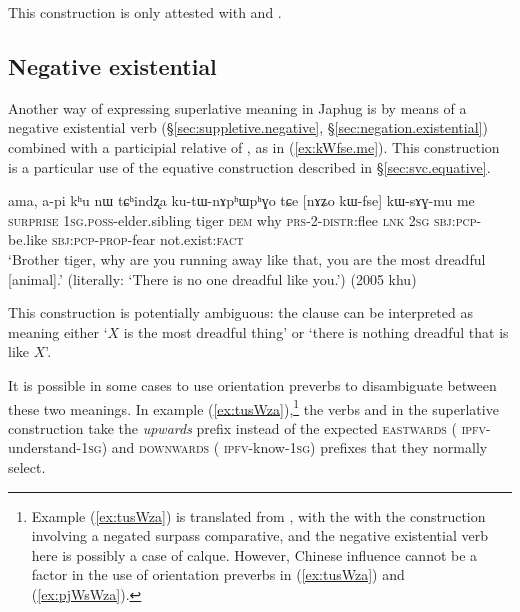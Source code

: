This construction is only attested with  and .

 \subsection{Negative existential} \label{sec:negative.existential.superlative}
Another way of expressing superlative meaning in Japhug is by means of a negative existential verb (§\ref{sec:suppletive.negative}, §\ref{sec:negation.existential}) combined with a participial relative of , as in (\ref{ex:kWfse.me}). This construction is a particular use of the equative construction described in §\ref{sec:svc.equative}.


 \begin{exe}
\ex \label{ex:kWfse.me}
\gll ama, a-pi kʰu nɯ tɕʰindʐa ku-tɯ-nɤpʰɯpʰɣo tɕe [nɤʑo kɯ-fse] kɯ-sɤɣ-mu me	\\
\textsc{surprise} \textsc{1sg}.\textsc{poss}-elder.sibling tiger \textsc{dem} why \textsc{prs}-2-\textsc{distr}:flee \textsc{lnk} \textsc{2sg}  \textsc{sbj}:\textsc{pcp}-be.like   \textsc{sbj}:\textsc{pcp}-\textsc{prop}-fear  not.exist:\textsc{fact} \\
\glt `Brother tiger, why are you running away like that, you are the most dreadful [animal].' (literally: `There is no one dreadful like you.') (2005 khu)
\end{exe}

This construction is potentially ambiguous: the clause  can be interpreted as meaning either  `$X$ is the most dreadful thing' or `there is nothing dreadful that is like $X$'. 

It is possible in some cases to use orientation preverbs to disambiguate between these two meanings. In example (\ref{ex:tusWza}),\footnote{Example  (\ref{ex:tusWza}) is translated from , with the  with the construction  involving a negated surpass comparative, and the negative existential verb here is possibly a case of calque. However, Chinese influence cannot be a factor in the  use of orientation preverbs in (\ref{ex:tusWza}) and (\ref{ex:pjWsWza}). } the verbs  and  in the superlative construction take the \textsl{upwards} prefix  instead of the expected \textsc{eastwards} ( \textsc{ipfv}-understand-\textsc{1sg}) and \textsc{downwards} ( \textsc{ipfv}-know-\textsc{1sg}) prefixes that they normally select.


